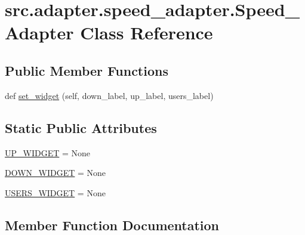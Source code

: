\hypertarget{classsrc_1_1adapter_1_1speed__adapter_1_1Speed__Adapter}{}\section{src.\+adapter.\+speed\+\_\+adapter.\+Speed\+\_\+\+Adapter Class Reference}
\label{classsrc_1_1adapter_1_1speed__adapter_1_1Speed__Adapter}
\subsection*{Public Member Functions}
\begin{DoxyCompactItemize}
\item 
def \hyperlink{classsrc_1_1adapter_1_1speed__adapter_1_1Speed__Adapter_a3d8fac7caed6745662def3d800c44c6f}{set\+\_\+widget} (self, down\+\_\+label, up\+\_\+label, users\+\_\+label)
\end{DoxyCompactItemize}
\subsection*{Static Public Attributes}
\begin{DoxyCompactItemize}
\item 
\hyperlink{classsrc_1_1adapter_1_1speed__adapter_1_1Speed__Adapter_a8c3f1760b329c8da444488fd50f1a128}{U\+P\+\_\+\+W\+I\+D\+G\+E\+T} = None
\item 
\hyperlink{classsrc_1_1adapter_1_1speed__adapter_1_1Speed__Adapter_ae7ae8ac17406badcb53a0b2b90127f41}{D\+O\+W\+N\+\_\+\+W\+I\+D\+G\+E\+T} = None
\item 
\hyperlink{classsrc_1_1adapter_1_1speed__adapter_1_1Speed__Adapter_a02e9c7a2cd8b9d8c8a9dc8921ba32768}{U\+S\+E\+R\+S\+\_\+\+W\+I\+D\+G\+E\+T} = None
\end{DoxyCompactItemize}


\subsection{Member Function Documentation}
\hypertarget{classsrc_1_1adapter_1_1speed__adapter_1_1Speed__Adapter_a3d8fac7caed6745662def3d800c44c6f}{}
